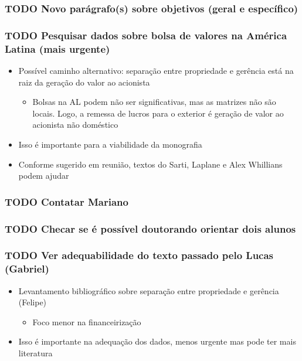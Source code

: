 \documentclass[11pt]{article}
\begin{document}
\subsubsection*{{\bfseries\sffamily TODO} Novo parágrafo(s) sobre objetivos (geral e específico)}
\label{sec:orga5b3529}

\subsubsection*{{\bfseries\sffamily TODO} Pesquisar dados sobre bolsa de valores na América Latina (mais urgente)}
\label{sec:org3c164d0}

\begin{itemize}
\item Possível caminho alternativo: separação entre propriedade e gerência está na raiz da geração do valor ao acionista
\begin{itemize}
\item Bolsas na AL podem não ser significativas, mas as matrizes não são locais. Logo, a remessa de lucros para o exterior é geração de valor ao acionista não doméstico
\end{itemize}
\item Isso é importante para a viabilidade da monografia
\item Conforme sugerido em reunião, textos do Sarti, Laplane e Alex Whillians podem ajudar
\end{itemize}


\subsubsection*{{\bfseries\sffamily TODO} Contatar Mariano}
\label{sec:org1336633}

\subsubsection*{{\bfseries\sffamily TODO} Checar se é possível doutorando orientar dois alunos}
\label{sec:org188d3bf}

\subsubsection*{{\bfseries\sffamily TODO} Ver adequabilidade do texto passado pelo Lucas (Gabriel)}
\label{sec:orgee356e9}
\begin{itemize}
\item Levantamento bibliográfico sobre separação entre propriedade e gerência (Felipe)
\begin{itemize}
\item Foco menor na financeirização
\end{itemize}
\item Isso é importante na adequação dos dados, menos urgente mas pode ter mais literatura
\end{itemize}
\end{document}
